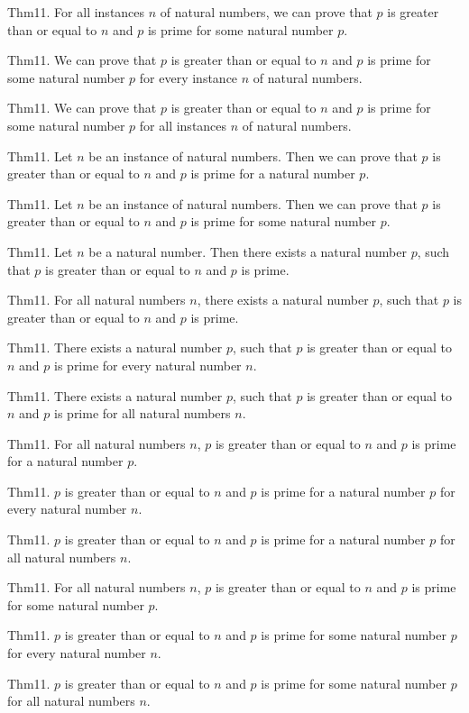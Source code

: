 \documentclass{article}
\begin{document}
Thm11. For all instances $n$ of natural numbers, we can prove that $p$ is greater than or equal to $n$ and $p$ is prime for some natural number $p$.

Thm11. We can prove that $p$ is greater than or equal to $n$ and $p$ is prime for some natural number $p$ for every instance $n$ of natural numbers.

Thm11. We can prove that $p$ is greater than or equal to $n$ and $p$ is prime for some natural number $p$ for all instances $n$ of natural numbers.

Thm11. Let $n$ be an instance of natural numbers. Then we can prove that $p$ is greater than or equal to $n$ and $p$ is prime for a natural number $p$.

Thm11. Let $n$ be an instance of natural numbers. Then we can prove that $p$ is greater than or equal to $n$ and $p$ is prime for some natural number $p$.

Thm11. Let $n$ be a natural number. Then there exists a natural number $p$, such that $p$ is greater than or equal to $n$ and $p$ is prime.

Thm11. For all natural numbers $n$, there exists a natural number $p$, such that $p$ is greater than or equal to $n$ and $p$ is prime.

Thm11. There exists a natural number $p$, such that $p$ is greater than or equal to $n$ and $p$ is prime for every natural number $n$.

Thm11. There exists a natural number $p$, such that $p$ is greater than or equal to $n$ and $p$ is prime for all natural numbers $n$.

Thm11. For all natural numbers $n$, $p$ is greater than or equal to $n$ and $p$ is prime for a natural number $p$.

Thm11. $p$ is greater than or equal to $n$ and $p$ is prime for a natural number $p$ for every natural number $n$.

Thm11. $p$ is greater than or equal to $n$ and $p$ is prime for a natural number $p$ for all natural numbers $n$.

Thm11. For all natural numbers $n$, $p$ is greater than or equal to $n$ and $p$ is prime for some natural number $p$.

Thm11. $p$ is greater than or equal to $n$ and $p$ is prime for some natural number $p$ for every natural number $n$.

Thm11. $p$ is greater than or equal to $n$ and $p$ is prime for some natural number $p$ for all natural numbers $n$.
\end{document}
